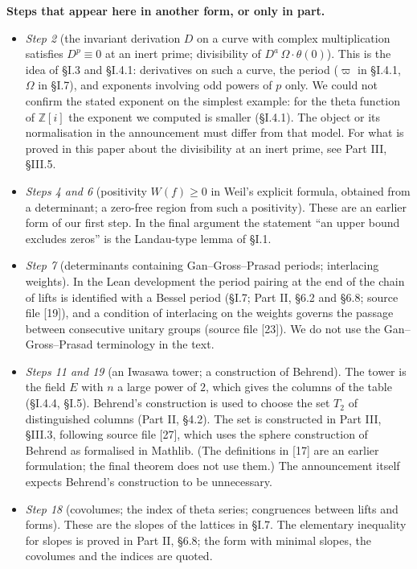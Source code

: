 \documentclass[11pt,letterpaper]{article}
\newcommand{\Z}{\mathbb Z}\newcommand{\Q}{\mathbb Q}\newcommand{\C}{\mathbb C}
\begin{document}
\textbf{Steps that appear here in another form, or only in part.}

\begin{itemize}
\item \emph{Step 2} (the invariant derivation $D$ on a curve with complex multiplication satisfies
$D^p\equiv0$ at an inert prime; divisibility of $D^a\,\Omega\cdot\theta(0)$). This is the idea of \S I.3 and
\S I.4.1: derivatives on such a curve, the period ($\varpi$ in \S I.4.1, $\Omega$ in \S I.7), and exponents involving odd powers of $p$ only.
We could not confirm the stated exponent on the simplest example: for the theta function of $\Z[i]$ the
exponent we computed is smaller (\S I.4.1). The object or its normalisation in the announcement must differ
from that model. For what is proved in this paper about the divisibility at an inert prime, see Part III,
\S III.5.
\item \emph{Steps 4 and 6} (positivity $W(f)\ge0$ in Weil's explicit formula, obtained from a determinant; a
zero-free region from such a positivity). These are an earlier form of our first step. In the final
argument the statement ``an upper bound excludes zeros'' is the Landau-type lemma of \S I.1.
\item \emph{Step 7} (determinants containing Gan--Gross--Prasad periods; interlacing weights). In the Lean
development the period pairing at the end of the chain of lifts is identified with a Bessel period (\S I.7;
Part II, \S6.2 and \S6.8; source file [19]), and a condition of interlacing on the weights governs the
passage between consecutive unitary groups (source file [23]). We do not use the Gan--Gross--Prasad
terminology in the text.
\item \emph{Steps 11 and 19} (an Iwasawa tower; a construction of Behrend). The tower is the field $E$ with
$n$ a large power of $2$, which gives the columns of the table (\S I.4.4, \S I.5). Behrend's construction
is used to choose the set $T_2$ of distinguished columns (Part II, \S4.2). The set is constructed in
Part III, \S III.3, following source file [27], which uses the sphere construction of Behrend as formalised
in Mathlib. (The definitions in [17] are an earlier formulation; the final theorem does not use them.) The announcement itself expects Behrend's construction to be unnecessary.
\item \emph{Step 18} (covolumes; the index of theta series; congruences between lifts and forms). These are
the slopes of the lattices in \S I.7. The elementary inequality for slopes is proved in Part II, \S6.8; the form with minimal slopes, the covolumes and the indices are quoted.
\end{itemize}
\end{document}
